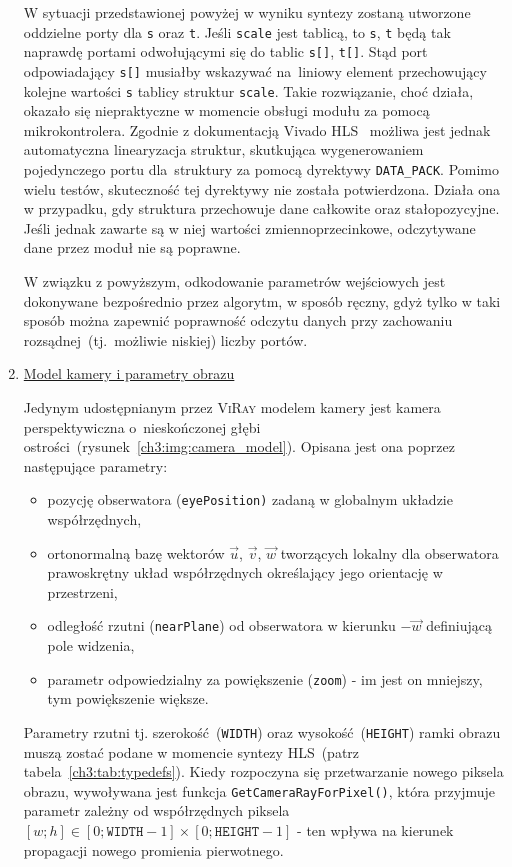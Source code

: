 \begin{enumerate}
W sytuacji przedstawionej powyżej w wyniku syntezy zostaną utworzone oddzielne porty dla \texttt{s} oraz \texttt{t}. Jeśli \texttt{scale} jest tablicą, to \texttt{s}, \texttt{t} będą tak naprawdę portami odwołującymi się do tablic \texttt{s[]}, \texttt{t[]}. Stąd port odpowiadający \texttt{s[]} musiałby wskazywać na~liniowy element przechowujący kolejne wartości \texttt{s} tablicy struktur \texttt{scale}. Takie rozwiązanie, choć działa, okazało się niepraktyczne w momencie obsługi modułu za pomocą mikrokontrolera. Zgodnie z dokumentacją Vivado HLS~\cite{UG902} możliwa jest jednak automatyczna linearyzacja struktur, skutkująca wygenerowaniem pojedynczego portu dla~struktury za pomocą dyrektywy \texttt{DATA\_PACK}. Pomimo wielu testów, skuteczność tej dyrektywy nie została potwierdzona. Działa ona w przypadku, gdy struktura przechowuje dane całkowite oraz stałopozycyjne. Jeśli jednak zawarte są w niej wartości zmiennoprzecinkowe, odczytywane dane przez moduł nie są poprawne. 

W związku z powyższym, odkodowanie parametrów wejściowych jest dokonywane bezpośrednio przez algorytm, w sposób ręczny, gdyż tylko w taki sposób można zapewnić poprawność odczytu danych przy zachowaniu rozsądnej~(tj.~możliwie niskiej) liczby portów.


\item \underline{Model kamery i parametry obrazu}

Jedynym udostępnianym przez \textsc{ViRay} modelem kamery jest kamera perspektywiczna o~nieskończonej głębi ostrości~(rysunek~\ref{ch3:img:camera_model}). Opisana jest ona poprzez następujące parametry:
\begin{itemize}
\item pozycję obserwatora (\texttt{eyePosition)} zadaną w globalnym układzie współrzędnych,
\item ortonormalną bazę wektorów $\vec{u}$, $\vec{v}$, $\vec{w}$ tworzących lokalny dla obserwatora prawoskrętny układ współrzędnych określający jego orientację w przestrzeni,
\item odległość rzutni (\texttt{nearPlane}) od obserwatora w kierunku $-\vec{w}$ definiującą pole widzenia,
\item parametr odpowiedzialny za powiększenie (\texttt{zoom}) - im jest on mniejszy, tym powiększenie większe.
\end{itemize}
Parametry rzutni tj. szerokość~(\texttt{WIDTH}) oraz wysokość~(\texttt{HEIGHT}) ramki obrazu muszą zostać podane w momencie syntezy HLS~(patrz tabela~\ref{ch3:tab:typedefs}). Kiedy rozpoczyna się przetwarzanie nowego piksela obrazu, wywoływana jest funkcja \texttt{GetCameraRayForPixel()}, która przyjmuje parametr zależny od współrzędnych piksela $[w; h] \in [0; \mathtt{WIDTH} - 1]\times[0; \mathtt{HEIGHT} - 1]$ - ten wpływa na kierunek propagacji nowego promienia pierwotnego.


\end{enumerate}
